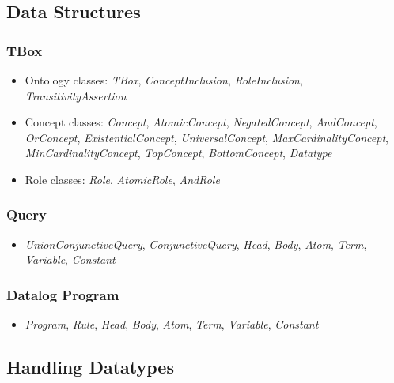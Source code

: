 \documentclass[oneside]{book}
\begin{document}
\subsection{Data Structures}

\subsubsection{TBox}
\begin{itemize}
\item Ontology classes: \textit{TBox},  \textit{ConceptInclusion},  \textit{RoleInclusion},  \textit{TransitivityAssertion}

\item Concept classes: \textit{Concept},  \textit{AtomicConcept},  \textit{NegatedConcept},  \textit{AndConcept},  \textit{OrConcept},  \textit{ExistentialConcept},  \textit{UniversalConcept},  \textit{MaxCardinalityConcept},  \textit{MinCardinalityConcept},  \textit{TopConcept},  \textit{BottomConcept}, \textit{Datatype}

\item Role classes: \textit{Role},  \textit{AtomicRole}, \textit{AndRole}
\end{itemize}


\subsubsection{Query}
\begin{itemize}
	
	\item  \textit{UnionConjunctiveQuery},  \textit{ConjunctiveQuery},  \textit{Head},  \textit{Body},  \textit{Atom},  \textit{Term},  \textit{Variable},  \textit{Constant}
\end{itemize}


\subsubsection{Datalog Program}
\begin{itemize}
	
	\item  \textit{Program},  \textit{Rule},  \textit{Head},  \textit{Body},  \textit{Atom},  \textit{Term},  \textit{Variable},  \textit{Constant}
\end{itemize}


\subsection{Handling Datatypes}
\end{document}
